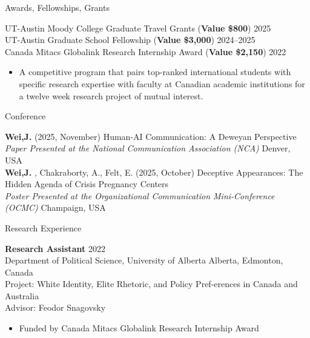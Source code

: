 \documentclass[
	11pt, %
]{resume} %
\begin{document}
\begin{rSection}{Awards, Fellowships, Grants}
	
	UT-Austin Moody College Graduate Travel Grants (\textbf{Value \$800})  \hfill 2025\\
	UT-Austin Graduate School Fellowship   (\textbf{Value \$3,000})  \hfill 2024--2025\\
    Canada Mitacs Globalink Research Internship Award     (\textbf{Value \$2,150})  \hfill 2022
\vspace{-4pt}
\begin{itemize}
  \item A competitive program that pairs top-ranked international students with specific research expertise with faculty at Canadian academic institutions for a twelve week research project of mutual interest.\\
\end{itemize}
	
\end{rSection}


\begin{rSection}{Conference}
	
	\textbf{Wei,J.} (2025, November) Human-AI Communication: A Deweyan Perspective\\
	\textit{Paper Presented at the National Communication Association (NCA)} \hfill Denver, USA \\

	\textbf{Wei,J.} , Chakraborty, A., Felt, E. (2025, October) Deceptive Appearances: The Hidden Agenda of Crisis Pregnancy Centers \\
	\textit{Poster Presented at the Organizational Communication Mini-Conference (OCMC)} \hfill Champaign, USA \\
	
\end{rSection}


\begin{rSection}{Research Experience}
	
	\textbf{Research Assistant} \hfill 2022\\
	Department of Political Science, University of Alberta \hfill Alberta, Edmonton, Canada \\
    {Project:} White Identity, Elite Rhetoric, and Policy Pref-erences in Canada and Australia\\
    {Advisor:} Feodor Snagovsky
\vspace{-4pt}
\begin{itemize}
  \item Funded by Canada Mitacs Globalink Research Internship Award \\
\end{itemize}

	
\end{rSection}
\end{document}

